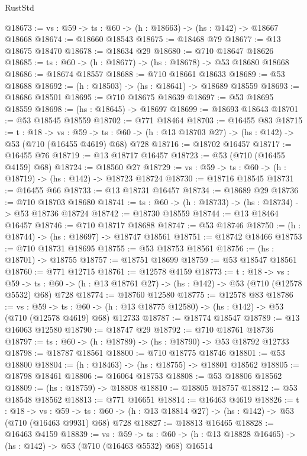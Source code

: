 \begin{lexlean}{RustStd}
\begin{coremodule}
@18673 := {vs : @59} -> {ts : @60} -> (h : @18663) -> (hs : @142) -> @18667 @18668
@18674 := @18660 @18543
@18675 := @18468 @79
@18677 := @13 @18675 @18470
@18678 := @18634 @29
@18680 := @710 @18647 @18626
@18685 := {ts : @60} -> (h : @18677) -> (hs : @18678) -> @53 @18680 @18668
@18686 := @18674 @18557
@18688 := @710 @18661 @18633
@18689 := @53 @18688
@18692 := (h : @18503) -> (hs : @18641) -> @18689 @18559
@18693 := @18686 @18501
@18695 := @710 @18675 @18639
@18697 := @53 @18695 @18559
@18698 := (hs : @18645) -> @18697
@18699 := @18693 @18643
@18701 := @53 @18545 @18559
@18702 := @771 @18464
@18703 := @16455 @83
@18715 := {t : @18} ->
  {vs : @59} ->
  {ts : @60} -> (h : @13 @18703 @27) -> (hs : @142) -> @53 (@710 (@16455 @4619) @68) @728
@18716 := @18702 @16457
@18717 := @16455 @76
@18719 := @13 @18717 @16457
@18723 := @53 (@710 (@16455 @4159) @68)
@18724 := @18560 @27
@18729 := {vs : @59} -> {ts : @60} -> (h : @18719) -> (hs : @142) -> @18723 @18724
@18730 := @18716 @18545
@18731 := @16455 @66
@18733 := @13 @18731 @16457
@18734 := @18689 @29
@18736 := @710 @18703 @18680
@18741 := {ts : @60} -> (h : @18733) -> (hs : @18734) -> @53 @18736 @18724
@18742 := @18730 @18559
@18744 := @13 @18464 @16457
@18746 := @710 @18717 @18688
@18747 := @53 @18746
@18750 := (h : @18744) -> (hs : @18697) -> @18747 @18561
@18751 := @18742 @18466
@18753 := @710 @18731 @18695
@18755 := @53 @18753 @18561
@18756 := (hs : @18701) -> @18755
@18757 := @18751 @18699
@18759 := @53 @18547 @18561
@18760 := @771 @12715
@18761 := @12578 @4159
@18773 := {t : @18} ->
  {vs : @59} ->
  {ts : @60} -> (h : @13 @18761 @27) -> (hs : @142) -> @53 (@710 (@12578 @5532) @68) @728
@18774 := @18760 @12580
@18775 := @12578 @83
@18786 := {vs : @59} ->
  {ts : @60} -> (h : @13 @18775 @12580) -> (hs : @142) -> @53 (@710 (@12578 @4619) @68) @12733
@18787 := @18774 @18547
@18789 := @13 @16063 @12580
@18790 := @18747 @29
@18792 := @710 @18761 @18736
@18797 := {ts : @60} -> (h : @18789) -> (hs : @18790) -> @53 @18792 @12733
@18798 := @18787 @18561
@18800 := @710 @18775 @18746
@18801 := @53 @18800
@18804 := (h : @18463) -> (hs : @18755) -> @18801 @18562
@18805 := @18798 @18461
@18806 := @16064 @18753
@18808 := @53 @18806 @18562
@18809 := (hs : @18759) -> @18808
@18810 := @18805 @18757
@18812 := @53 @18548 @18562
@18813 := @771 @16651
@18814 := @16463 @4619
@18826 := {t : @18} ->
  {vs : @59} ->
  {ts : @60} -> (h : @13 @18814 @27) -> (hs : @142) -> @53 (@710 (@16463 @9931) @68) @728
@18827 := @18813 @16465
@18828 := @16463 @4159
@18839 := {vs : @59} ->
  {ts : @60} -> (h : @13 @18828 @16465) -> (hs : @142) -> @53 (@710 (@16463 @5532) @68) @16514

\end{coremodule}
\end{lexlean}
